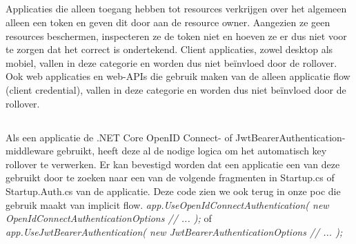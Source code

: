 \subsection{}
Applicaties die alleen toegang hebben tot resources verkrijgen over het algemeen alleen een token en geven dit door aan de resource owner. Aangezien ze geen resources beschermen, inspecteren ze de token niet en hoeven ze er dus niet voor te zorgen dat het correct is ondertekend. Client applicaties, zowel desktop als mobiel, vallen in deze categorie en worden dus niet beïnvloed door de rollover. Ook web applicaties en web-APIs die gebruik maken van de alleen applicatie flow (client credential), vallen in deze categorie en worden dus niet beïnvloed door de rollover.
\subsection{}
Als een applicatie de .NET Core OpenID Connect- of JwtBearerAuthentication-middleware gebruikt, heeft deze al de nodige logica om het automatisch key rollover te verwerken. Er kan bevestigd worden dat een applicatie een van deze gebruikt door te zoeken naar een van de volgende fragmenten in Startup.cs of Startup.Auth.cs van de applicatie. Deze code zien we ook terug in onze poc die gebruik maakt van implicit flow. \newline
\emph{
app.UseOpenIdConnectAuthentication(\newline
new OpenIdConnectAuthenticationOptions\newline
{\newline
	// ...\newline
});\newline
}\newline
of \newline
\emph{
app.UseJwtBearerAuthentication(\newline
new JwtBearerAuthenticationOptions\newline
{\newline
	// ...\newline
});\newline
}\newline
